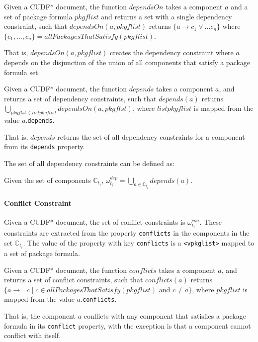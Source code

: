 \begin{defs}
Given a CUDF* document, the function $dependsOn$ takes a component $a$ and a set of package formula $pkgflist$ and returns a set with a single dependency constraint,
such that $dependsOn(a,pkgflist)$ returns $\{a \rightarrow c_1 \vee \ldots c_n\}$ where  $\{c_1,\ldots,c_n\} = allPackagesThatSatisfy(pkgflist)$.
\end{defs}
That is, $dependsOn(a,pkgflist)$ creates the dependency  constraint where $a$ depends on the disjunction of the union of all components that satisfy a package formula set. 

\begin{defs}
Given a CUDF* document, the function $depends$ takes a component $a$, and returns a set of dependency constraints,
such that $depends(a)$ returns $\bigcup \limits_{pkgflst \in listpkgflist} dependsOn(a,pkgflst)$, where $listpkgflist$ is mapped from the value $a$.\texttt{depends}.
\end{defs}
That is, $depends$ returns the set of all dependency constraints for a component from its \verb+depends+ property.

The set of all dependency constraints can be defined as:
\begin{defs}
Given the set of components $\mathbb{C}_{t_i}$, $\omega_{t_i}^{dep} = \bigcup \limits_{a \in \mathbb{C}_{t_i}} depends(a)$.
\end{defs}

\paragraph{Conflict Constraint}
Given a CUDF* document, the set of conflict constraints is $\omega_{t_i}^{con}$.
These constraints are extracted from the property \texttt{conflicts} in the components in the set $\mathbb{C}_{t_i}$.
The value of the property with key \texttt{conflicts} is a \texttt{<vpkglist>} mapped to a set of package formula.

\begin{defs}
Given a CUDF* document, the function $conflicts$ takes a component $a$, and returns a set of conflict constraints,
such that $conflicts(a)$ returns $\{a \rightarrow \neg c \mid c \in allPackagesThatSatisfy(pkgflist) \mbox { and } c \not = a \}$, where $pkgflist$ is mapped from the value $a$.\texttt{conflicts}.
\end{defs}

That is, the component $a$ conflicts with any component that satisfies a package formula in its \texttt{conflict} property,
with the exception is that a component cannot conflict with itself.

